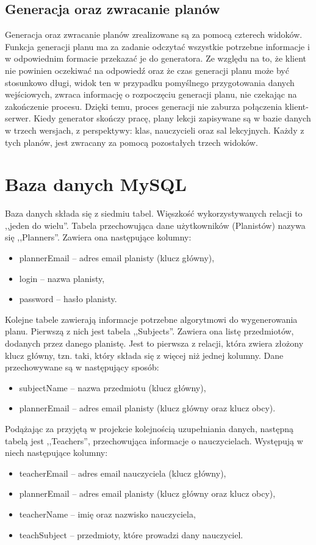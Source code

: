 \subsection{Generacja oraz zwracanie planów}
Generacja oraz zwracanie planów zrealizowane są za pomocą czterech widoków. Funkcja generacji planu ma za zadanie odczytać wszystkie potrzebne informacje i w odpowiednim formacie przekazać je do generatora. Ze względu na to, że klient nie powinien oczekiwać na odpowiedź oraz że czas generacji planu może być stosunkowo długi, widok ten w przypadku pomyślnego przygotowania danych wejściowych, zwraca informację o rozpoczęciu generacji planu, nie czekając na zakończenie procesu. Dzięki temu, proces generacji nie zaburza połączenia klient-serwer. Kiedy generator skończy pracę, plany lekcji zapisywane są w bazie danych w trzech wersjach, z perspektywy: klas, nauczycieli oraz sal lekcyjnych.
Każdy z tych planów, jest zwracany za pomocą pozostałych trzech widoków.

\section{Baza danych MySQL}
Baza danych składa się z siedmiu tabel. Więszkość wykorzystywanych relacji to ,,jeden do wielu''.
Tabela przechowująca dane użytkowników (Planistów) nazywa się ,,Planners''. Zawiera ona następujące kolumny:
\begin{itemize}
	\item plannerEmail -- adres email planisty (klucz główny),
	\item login -- nazwa planisty,
	\item password -- hasło planisty.
\end{itemize}

Kolejne tabele zawierają informacje potrzebne algorytmowi do wygenerowania planu. Pierwszą z nich jest tabela ,,Subjects''. Zawiera ona listę przedmiotów, dodanych przez danego planistę. Jest to pierwsza z relacji, która zwiera złożony klucz główny, tzn. taki, który składa się z więcej niż jednej kolumny. Dane przechowywane są w następujący sposób:
\begin{itemize}
	\item subjectName -- nazwa przedmiotu (klucz główny),
	\item plannerEmail -- adres email planisty (klucz główny oraz klucz obcy).
\end{itemize}

Podążając za przyjętą w projekcie kolejnością uzupełniania danych, następną tabelą jest ,,Teachers'', przechowująca informacje o nauczycielach. Występują w niech następujące kolumny:
\begin{itemize}
 	\item teacherEmail -- adres email nauczyciela (klucz główny),
 	\item plannerEmail -- adres email planisty (klucz główny oraz klucz obcy),
 	\item teacherName -- imię oraz nazwisko nauczyciela,
 	\item teachSubject -- przedmioty, które prowadzi dany nauczyciel.
\end{itemize}

